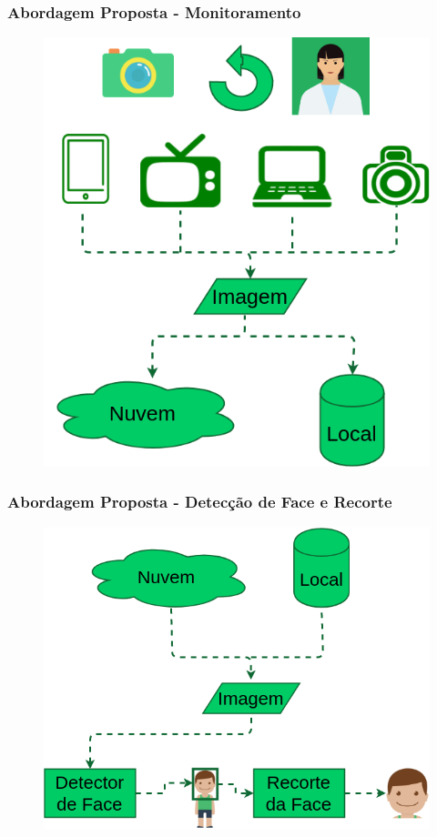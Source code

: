 \documentclass{beamer}
\begin{document}
\begin{frame}
\frametitle{Abordagem Proposta - Monitoramento }
\begin{figure}
\centering
\includegraphics[scale=0.37]{figuras/monitoramento_3.png}
\label{fig:arquitetura1}
\end{figure}
\end{frame}



\begin{frame}
\frametitle{Abordagem Proposta - Detecção de Face e Recorte}
\begin{figure}
\centering
\includegraphics[scale=0.37]{figuras/abordagem_4.png}
\label{fig:arquitetura2}
\end{figure}
\end{frame}
\end{document}
